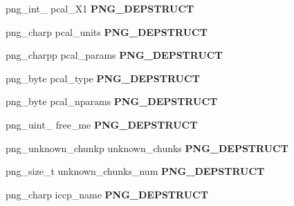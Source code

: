 \begin{DoxyCompactItemize}
\item 
png\+\_\+int\+\_ pcal\+\_\+\+X1 {\bfseries P\+N\+G\+\_\+\+D\+E\+P\+S\+T\+R\+U\+CT}\hypertarget{structpng__info__struct_af4c46785485ad93d7fdfc80bb0f40887}{}\label{structpng__info__struct_af4c46785485ad93d7fdfc80bb0f40887}

\item 
png\+\_\+charp pcal\+\_\+units {\bfseries P\+N\+G\+\_\+\+D\+E\+P\+S\+T\+R\+U\+CT}\hypertarget{structpng__info__struct_a875d95339a5fdecb416f357c152ef745}{}\label{structpng__info__struct_a875d95339a5fdecb416f357c152ef745}

\item 
png\+\_\+charpp pcal\+\_\+params {\bfseries P\+N\+G\+\_\+\+D\+E\+P\+S\+T\+R\+U\+CT}\hypertarget{structpng__info__struct_a64e4492175b6ae8a4968352d3ce648d6}{}\label{structpng__info__struct_a64e4492175b6ae8a4968352d3ce648d6}

\item 
png\+\_\+byte pcal\+\_\+type {\bfseries P\+N\+G\+\_\+\+D\+E\+P\+S\+T\+R\+U\+CT}\hypertarget{structpng__info__struct_ab8dddb306fedbde5d126d3e72bd9d07e}{}\label{structpng__info__struct_ab8dddb306fedbde5d126d3e72bd9d07e}

\item 
png\+\_\+byte pcal\+\_\+nparams {\bfseries P\+N\+G\+\_\+\+D\+E\+P\+S\+T\+R\+U\+CT}\hypertarget{structpng__info__struct_af9a3c2c714f850646092897a7f4ce1eb}{}\label{structpng__info__struct_af9a3c2c714f850646092897a7f4ce1eb}

\item 
png\+\_\+uint\+\_ free\+\_\+me {\bfseries P\+N\+G\+\_\+\+D\+E\+P\+S\+T\+R\+U\+CT}\hypertarget{structpng__info__struct_a79ba48435e223e17c03ef297d2b9b6e7}{}\label{structpng__info__struct_a79ba48435e223e17c03ef297d2b9b6e7}

\item 
png\+\_\+unknown\+\_\+chunkp unknown\+\_\+chunks {\bfseries P\+N\+G\+\_\+\+D\+E\+P\+S\+T\+R\+U\+CT}\hypertarget{structpng__info__struct_a21f80e93312ba086e49103f3689d6c44}{}\label{structpng__info__struct_a21f80e93312ba086e49103f3689d6c44}

\item 
png\+\_\+size\+\_\+t unknown\+\_\+chunks\+\_\+num {\bfseries P\+N\+G\+\_\+\+D\+E\+P\+S\+T\+R\+U\+CT}\hypertarget{structpng__info__struct_ad3ec26085db213daeecf98432cb405fc}{}\label{structpng__info__struct_ad3ec26085db213daeecf98432cb405fc}

\item 
png\+\_\+charp iccp\+\_\+name {\bfseries P\+N\+G\+\_\+\+D\+E\+P\+S\+T\+R\+U\+CT}\hypertarget{structpng__info__struct_ac0a443dae663a1482c7213dea082a8dd}{}\label{structpng__info__struct_ac0a443dae663a1482c7213dea082a8dd}


\end{DoxyCompactItemize}

